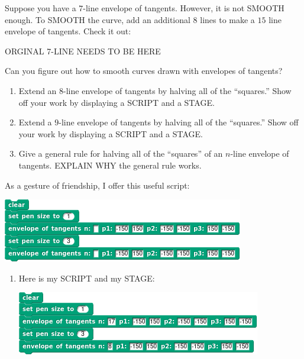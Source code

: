 \documentclass[noauthor,nooutcomes,hints]{ximera}
\begin{document}
\begin{question}
  Suppose you have a $7$-line envelope of tangents. However, it is not
  SMOOTH enough. To SMOOTH the curve, add an additional $8$ lines to
  make a $15$ line envelope of tangents. Check it out:
  \begin{center}
  ORGINAL 7-LINE NEEDS TO BE HERE  
  \end{center}
  Can you figure out how to smooth curves drawn with envelopes of
  tangents?
  \begin{enumerate}
    \item Extend an $8$-line envelope of tangents by halving all of
      the ``squares.''  Show off your work by displaying a SCRIPT and
      a STAGE.
    \item Extend a $9$-line envelope of tangents by halving all of the
      ``squares.''  Show off your work by displaying a SCRIPT and a
      STAGE.
    \item Give a general rule for halving all of the ``squares'' of an
      $n$-line envelope of tangents. EXPLAIN WHY the general rule works.
  \end{enumerate}
  As a gesture of friendship, I offer this useful script:
  \begin{center}
    \includegraphics{genericExtendedEnvelopeOfTan.png}
  \end{center}
  \begin{freeResponse}
    \begin{enumerate}
    \item Here is my SCRIPT and my STAGE:
      \begin{center}
        \includegraphics[width=.3\textwidth]{8-17-lineOfTanScript.png}\qquad{}

\end{center}
\end{enumerate}
\end{freeResponse}
\end{question}
\end{document}
